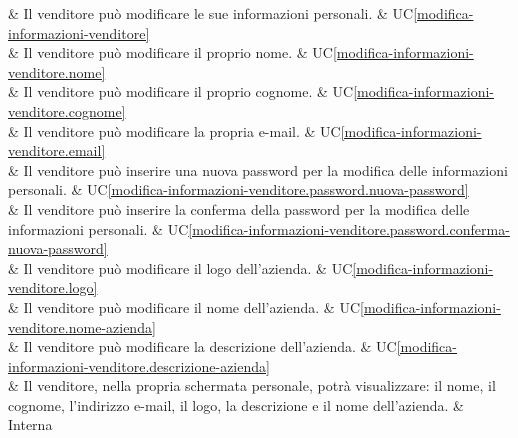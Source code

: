 & Il venditore può modificare le sue informazioni personali. & UC\ref{modifica-informazioni-venditore} \\
	
 & Il venditore può modificare il proprio nome. & UC\ref{modifica-informazioni-venditore.nome} \\
	
 & Il venditore può modificare il proprio cognome. & UC\ref{modifica-informazioni-venditore.cognome} \\
	
 & Il venditore può modificare la propria e-mail. & UC\ref{modifica-informazioni-venditore.email} \\
	
 & Il venditore può inserire una nuova password per la modifica delle informazioni personali. & UC\ref{modifica-informazioni-venditore.password.nuova-password} \\
	
 & Il venditore può inserire la conferma della password per la modifica delle informazioni personali. & UC\ref{modifica-informazioni-venditore.password.conferma-nuova-password} \\
	
 & Il venditore può modificare il logo dell'azienda. & UC\ref{modifica-informazioni-venditore.logo} \\
	
 & Il venditore può modificare il nome dell'azienda. & UC\ref{modifica-informazioni-venditore.nome-azienda} \\
	
 & Il venditore può modificare la descrizione dell'azienda. & UC\ref{modifica-informazioni-venditore.descrizione-azienda} \\
	
 & Il venditore, nella propria schermata personale, potrà visualizzare: il nome, il cognome, l'indirizzo e-mail, il logo, la descrizione e il nome dell'azienda. & Interna \\ 